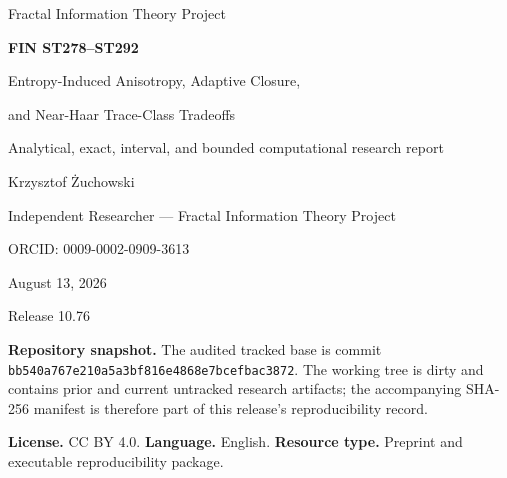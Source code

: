 \documentclass[11pt,a4paper]{article}
\begin{document}
\hypersetup{pageanchor=false}
\begin{titlepage}
\centering
\vspace*{1cm}
{\Large Fractal Information Theory Project\par}
\vspace{.9cm}
{\huge\bfseries FIN ST278--ST292\par}
\vspace{.35cm}
{\LARGE Entropy-Induced Anisotropy, Adaptive Closure,\par}
{\LARGE and Near-Haar Trace-Class Tradeoffs\par}
\vspace{1cm}
{\large Analytical, exact, interval, and bounded computational research report\par}
\vfill
{\Large Krzysztof \.{Z}uchowski\par}
\vspace{.2cm}
{\large Independent Researcher --- Fractal Information Theory Project\par}
{\large ORCID: 0009-0002-0909-3613\par}
\vspace{.8cm}
{\large August 13, 2026\par}
\vspace{.3cm}
{\large Release 10.76\par}
\vfill
\begin{minipage}{.92\textwidth}\small
\textbf{Repository snapshot.} The audited tracked base is commit
\texttt{bb540a767e210a5a3bf816e4868e7bcefbac3872}. The working tree is dirty and
contains prior and current untracked research artifacts; the accompanying SHA-256 manifest
is therefore part of this release's reproducibility record.

\medskip
\textbf{License.} CC BY 4.0. \quad \textbf{Language.} English. \quad
\textbf{Resource type.} Preprint and executable reproducibility package.
\end{minipage}
\end{titlepage}
\hypersetup{pageanchor=true}
\end{document}
